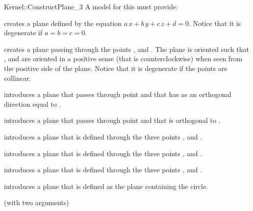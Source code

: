 \begin{ccRefFunctionObjectConcept}{Kernel::ConstructPlane_3}
A model for this must provide:


{creates a plane defined by the equation
 $a\, x +b\, y +c\, z + d = 0$.
Notice that it is degenerate if $a = b = c = 0$.}

{creates a plane passing through the points ,
  and . The plane is oriented such that , 
  and  are oriented in a positive sense 
 (that is counterclockwise) when seen from the positive side of the plane.
Notice that it is degenerate if the points are collinear.}


{introduces a plane that passes through point  and
 that has as an orthogonal direction equal to .}

{introduces a plane that passes through point  and
 that is orthogonal to .}

{introduces a plane that is defined through the three points 
 ,  and .}

{introduces a plane that is defined through the three points 
 ,  and .}

{introduces a plane that is defined through the three points 
 ,  and .}

{introduces a plane that is defined as the plane containing the circle.}

\ccRefines
{} (with two arguments)

\ccSeeAlso
{} \\

\end{ccRefFunctionObjectConcept}
